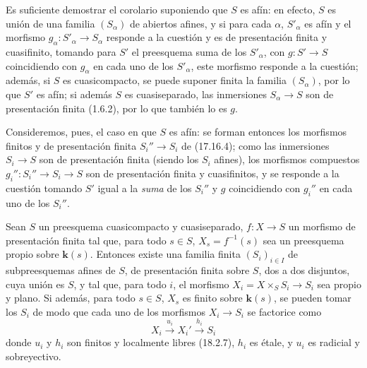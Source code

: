 Es suficiente demostrar el corolario suponiendo que $S$ es afín: en efecto, $S$ es unión de una familia $(S_\alpha)$ de abiertos afines, y si para cada $\alpha$, $S'_\alpha$ es afín y el morfismo $g_\alpha:S'_\alpha\to S_\alpha$ responde a la cuestión y es de presentación finita y cuasifinito, tomando para $S'$ el preesquema suma de los $S'_\alpha$, con $g:S'\to S$ coincidiendo con $g_\alpha$ en cada uno de los $S'_\alpha$, este morfismo responde a la cuestión; además, si $S$ es cuasicompacto, se puede suponer finita la familia $(S_\alpha)$, por lo que $S'$ es afín; si además $S$ es cuasiseparado, las inmersiones $S_\alpha\to S$ son de presentación finita (1.6.2), por lo que también lo es $g$.

Consideremos, pues, el caso en que $S$ es afín: se forman entonces los morfismos finitos y de presentación finita $S_i''\to S_i$ de (17.16.4); como las inmersiones $S_i\to S$ son de presentación finita (siendo los $S_i$ afines), los morfismos compuestos $g_i'':S_i''\to S_i\to S$ son de presentación finita y cuasifinitos, y se responde a la cuestión tomando $S'$ igual a la \emph{suma} de los $S_i''$ y $g$ coincidiendo con $g_i''$ en cada uno de los $S_i''$.

\begin{proposition}[17.16.6]
\label{IV.17.16.6}
Sean $S$ un preesquema cuasicompacto y cuasiseparado, $f:X\to S$ un morfismo de presentación finita tal que, para todo $s\in S$, $X_s=f^{-1}(s)$ sea un preesquema propio sobre $\boldsymbol{k}(s)$. Entonces existe una familia finita $(S_i)_{i\in I}$ de subpreesquemas afines de $S$, de presentación finita sobre $S$, dos a dos disjuntos, cuya unión es $S$, y tal que, para todo $i$, el morfismo $X_i=X\times_S S_i\to S_i$ sea \textup{propio} y \textup{plano}. Si además, para todo $s\in S$, $X_s$ es finito sobre $\boldsymbol{k}(s)$, se pueden tomar los $S_i$ de modo que cada uno de los morfismos $X_i\to S_i$ se factorice como
\[
  X_i\xrightarrow{u_i}X_i'\xrightarrow{h_i}S_i
\]
donde $u_i$ y $h_i$ son finitos y localmente libres \textup{(18.2.7)}, $h_i$ es étale, y $u_i$ es radicial y sobreyectivo.
\end{proposition}

